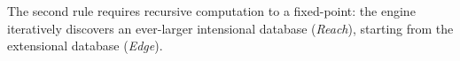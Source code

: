 \documentclass[nonacm,sigplan]{acmart}
\newcommand{\tool}{\textsc{GPUlog}}
\begin{document}
The second rule requires recursive computation to a fixed-point: the engine iteratively discovers an ever-larger intensional database (\textit{Reach}), starting from the extensional database (\textit{Edge}).
\end{document}
